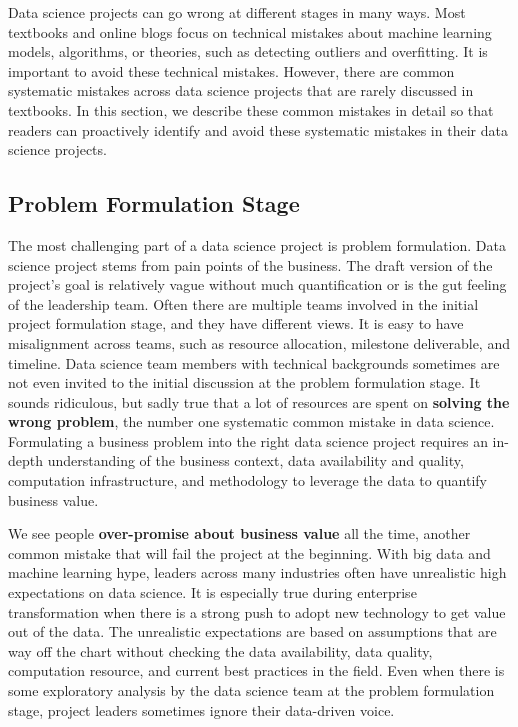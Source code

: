 \documentclass[
  12pt,
]{krantz}
\begin{document}
Data science projects can go wrong at different stages in many ways. Most textbooks and online blogs focus on technical mistakes about machine learning models, algorithms, or theories, such as detecting outliers and overfitting. It is important to avoid these technical mistakes. However, there are common systematic mistakes across data science projects that are rarely discussed in textbooks. In this section, we describe these common mistakes in detail so that readers can proactively identify and avoid these systematic mistakes in their data science projects.

\hypertarget{problem-formulation-stage}{%
\subsection{Problem Formulation Stage}\label{problem-formulation-stage}}

The most challenging part of a data science project is problem formulation. Data science project stems from pain points of the business. The draft version of the project's goal is relatively vague without much quantification or is the gut feeling of the leadership team. Often there are multiple teams involved in the initial project formulation stage, and they have different views. It is easy to have misalignment across teams, such as resource allocation, milestone deliverable, and timeline. Data science team members with technical backgrounds sometimes are not even invited to the initial discussion at the problem formulation stage. It sounds ridiculous, but sadly true that a lot of resources are spent on \textbf{solving the wrong problem}, the number one systematic common mistake in data science. Formulating a business problem into the right data science project requires an in-depth understanding of the business context, data availability and quality, computation infrastructure, and methodology to leverage the data to quantify business value.

We see people \textbf{over-promise about business value} all the time, another common mistake that will fail the project at the beginning. With big data and machine learning hype, leaders across many industries often have unrealistic high expectations on data science. It is especially true during enterprise transformation when there is a strong push to adopt new technology to get value out of the data. The unrealistic expectations are based on assumptions that are way off the chart without checking the data availability, data quality, computation resource, and current best practices in the field. Even when there is some exploratory analysis by the data science team at the problem formulation stage, project leaders sometimes ignore their data-driven voice.
\end{document}
